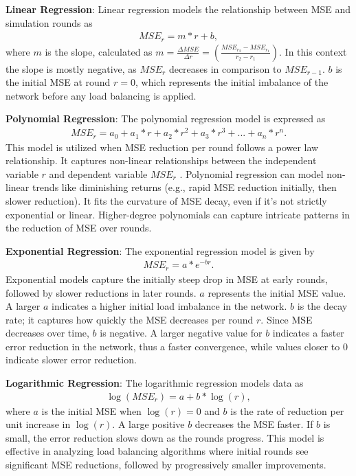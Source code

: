 \textbf{Linear Regression}: Linear regression models the relationship between MSE and simulation rounds as 
\begin{align}
    MSE_r=m*r+b,    
\end{align}
where $m$ is the slope, calculated as $m=\frac{\Delta MSE}{\Delta r}=(\frac{MSE_{r_2}-MSE_{r_1}}{r_2 - r_1})$. In this context the slope is mostly negative, as $MSE_r$ decreases in comparison to $MSE_{r-1}$. $b$ is the initial MSE at round $r=0$, which represents the initial imbalance of the network before any load balancing is applied.

\textbf{Polynomial Regression}: The polynomial regression model is expressed as
\begin{align}
    MSE_r=a_0+a_1*r+a_2*r^{2}+a_3*r^{3}+...+a_n*r^{n}.    
\end{align}
This model is utilized when MSE reduction per round follows a power law relationship. It captures non-linear relationships between the independent variable $r$ and dependent variable $MSE_r$ \cite{MotulskyDataFitting}. Polynomial regression can model non-linear trends like diminishing returns (e.g., rapid MSE reduction initially, then slower reduction). It fits the curvature of MSE decay, even if it's not strictly exponential or linear. Higher-degree polynomials can capture intricate patterns in the reduction of MSE over rounds.

\textbf{Exponential Regression}: The exponential regression model is given by 
\begin{align}
    MSE_r=a*e^{-br}.    
\end{align}
Exponential models capture the initially steep drop in MSE at early rounds, followed by slower reductions in later rounds. $a$ represents the initial MSE value. A larger $a$ indicates a higher initial load imbalance in the network. $b$ is the decay rate; it captures how quickly the MSE decreases per round $r$. Since MSE decreases over time, $b$ is negative. A larger negative value for $b$ indicates a faster error reduction in the network, thus a faster convergence, while values closer to 0 indicate slower error reduction.

\textbf{Logarithmic Regression}: The logarithmic regression models data as
\begin{align}
    \log{(MSE_r)}=a+b*\log{(r)},    
\end{align}
where $a$ is the initial MSE when $\log{(r)}=0$ and $b$ is the rate of reduction per unit increase in $\log{(r)}$. A large positive $b$ decreases the MSE faster. If $b$ is small, the error reduction slows down as the rounds progress. This model is effective in analyzing load balancing algorithms where initial rounds see significant MSE reductions, followed by progressively smaller improvements.

